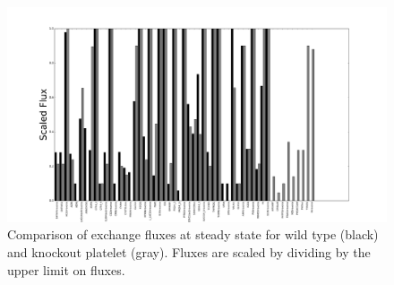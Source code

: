 \documentclass[11pt]{article}
\begin{document}
\begin{landscape}
\begin{figure}
\hspace{-2cm}
\includegraphics[scale=.55]{../figures/barSSKnockouts[5742,5743]Transport_Extracellular}
\caption{Comparison of exchange fluxes at steady state for wild type (black) and knockout platelet (gray). Fluxes are scaled by dividing by the upper limit on fluxes.}
\label{fig:knockoutExchangeSS}
\end{figure}
\end{landscape}
\end{document}
